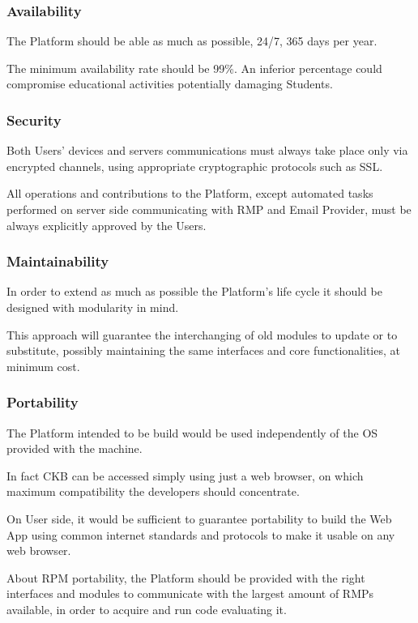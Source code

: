 \subsubsection{Availability}
The Platform should be able as much as possible, 24/7, 365 days per year. 

The minimum availability rate should be 99\%. An inferior percentage could compromise educational activities potentially damaging Students.

\subsubsection{Security}
Both Users' devices and servers communications must always take place only via encrypted channels, using appropriate cryptographic protocols such as SSL. 

All operations and contributions to the Platform, except automated tasks performed on server side communicating with RMP and Email Provider, must be always explicitly approved by the Users.

\subsubsection{Maintainability}
In order to extend as much as possible the Platform's life cycle it should be designed with modularity in mind. 

This approach will guarantee the interchanging of old modules to update or to substitute, possibly maintaining the same interfaces and core functionalities, at minimum cost.

\subsubsection{Portability}
The Platform intended to be build would be used independently of the OS provided with the machine. 

In fact CKB can be accessed simply using just a web browser, on which maximum compatibility the developers should concentrate. 

On User side, it would be sufficient to guarantee portability to build the Web App using common internet standards and protocols to make it usable on any web browser.

About RPM portability, the Platform should be provided with the right interfaces and modules to communicate with the largest amount of RMPs available, in order to acquire and run code evaluating it.